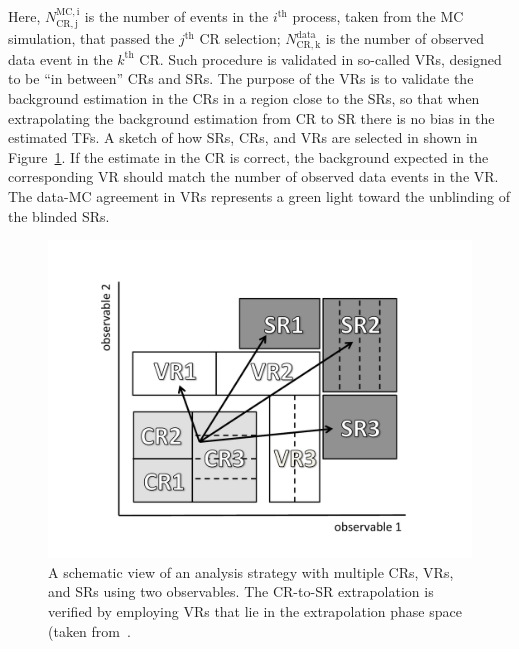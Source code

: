 		\noindent Here, $N_{\mathrm{CR,j}}^{\mathrm{MC,i}}$ is the number of events in the $i^{\mathrm{th}}$ process, taken from the \ac{MC} simulation, that passed the $j^{\mathrm{th}}$ CR selection; $N_{\mathrm{CR,k}}^{\mathrm{data}}$ is the number of observed data event in the $k^{\mathrm{th}}$ \ac{CR}. Such procedure is validated in so-called \acp{VR}, designed to be ``in between'' \acp{CR} and \acp{SR}. The purpose of the \acp{VR} is to validate the background estimation in the \acp{CR} in a region close to the \acp{SR}, so that when extrapolating the background estimation from \ac{CR} to \ac{SR} there is no bias in the estimated \acp{TF}. A sketch of how \acp{SR}, \acp{CR}, and \acp{VR} are selected in shown in Figure~\ref{fig:extrapolation}. If the estimate in the \ac{CR} is correct, the background expected in the corresponding \ac{VR} should match the number of observed data events in the \ac{VR}. The data-\ac{MC} agreement in \acp{VR} represents a green light toward the unblinding of the blinded \acp{SR}.

		\begin{figure}[!htb]
		  \begin{center}
		   \includegraphics[width=\textwidth]{figures/stop/cartoon_CRVRSR_bw}
		   \caption{A schematic view of an analysis strategy with multiple \acp{CR}, \acp{VR}, and \acp{SR} using two observables. The \ac{CR}-to-\ac{SR} extrapolation is verified by employing \acp{VR} that lie in the extrapolation phase space (taken from~\cite{histfitter}.}
		   \label{fig:extrapolation}
		  \end{center}
		\end{figure}

